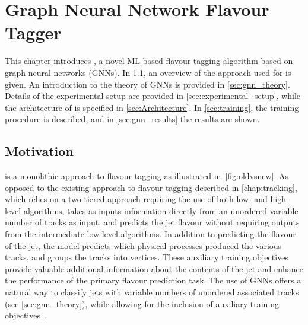 \chapter{Graph Neural Network Flavour Tagger}\label{chap:gnn_tagger}

This chapter introduces \GNN, a novel ML-based flavour tagging algorithm based on graph neural networks (GNNs).
In \cref{sec:gnn_motvation}, an overview of the approach used for \GNN is given.
An introduction to the theory of GNNs is provided in \cref{sec:gnn_theory}.
Details of the experimental setup are provided in \cref{sec:experimental_setup}, while the architecture of \GNN is specified in \cref{sec:Architecture}.
In \cref{sec:training}, the training procedure is described, and in \cref{sec:gnn_results} the results are shown.

\section{Motivation}\label{sec:gnn_motvation}

\GNN is a monolithic approach to flavour tagging as illustrated in~\cref{fig:oldvsnew}.
As opposed to the existing approach to flavour tagging described in \cref{chap:tracking}, which relies on a two tiered approach requiring the use of both low- and high-level algorithms,
\GNN takes as inputs information directly from an unordered variable number of tracks as input, and predicts the jet flavour without requiring outputs from the intermediate low-level algorithms.
In addition to predicting the flavour of the jet, the model predicts which physical processes produced the various tracks, and groups the tracks into vertices.
These auxiliary training objectives provide valuable additional information about the contents of the jet and enhance the performance of the primary flavour prediction task.
The use of GNNs offers a natural way to classify jets with variable numbers of unordered associated tracks (see \cref{sec:gnn_theory}), while allowing for the inclusion of auxiliary training objectives~\cite{2020-gnn-for-sv,serviansky2020set2graph}.

